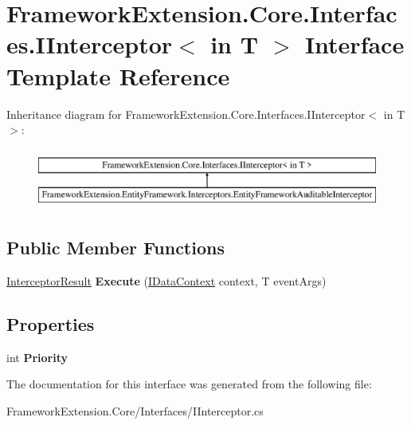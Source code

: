 \hypertarget{interface_framework_extension_1_1_core_1_1_interfaces_1_1_i_interceptor-g}{\section{Framework\-Extension.\-Core.\-Interfaces.\-I\-Interceptor$<$ in T $>$ Interface Template Reference}
\label{interface_framework_extension_1_1_core_1_1_interfaces_1_1_i_interceptor-g}
}
Inheritance diagram for Framework\-Extension.\-Core.\-Interfaces.\-I\-Interceptor$<$ in T $>$\-:\begin{figure}[H]
\begin{center}
\leavevmode
\includegraphics[height=2.000000cm]{interface_framework_extension_1_1_core_1_1_interfaces_1_1_i_interceptor-g}
\end{center}
\end{figure}
\subsection*{Public Member Functions}
\begin{DoxyCompactItemize}
\item 
\hypertarget{interface_framework_extension_1_1_core_1_1_interfaces_1_1_i_interceptor-g_a29390fc2dbc8566a239a46ce86431948}{\hyperlink{struct_framework_extension_1_1_core_1_1_interceptors_1_1_interceptor_result}{Interceptor\-Result} {\bfseries Execute} (\hyperlink{interface_framework_extension_1_1_core_1_1_interfaces_1_1_i_data_context}{I\-Data\-Context} context, T event\-Args)}\label{interface_framework_extension_1_1_core_1_1_interfaces_1_1_i_interceptor-g_a29390fc2dbc8566a239a46ce86431948}

\end{DoxyCompactItemize}
\subsection*{Properties}
\begin{DoxyCompactItemize}
\item 
\hypertarget{interface_framework_extension_1_1_core_1_1_interfaces_1_1_i_interceptor-g_a8dad5bbb0d6784578d68e58e8d836f2c}{int {\bfseries Priority}}\label{interface_framework_extension_1_1_core_1_1_interfaces_1_1_i_interceptor-g_a8dad5bbb0d6784578d68e58e8d836f2c}

\end{DoxyCompactItemize}


The documentation for this interface was generated from the following file\-:\begin{DoxyCompactItemize}
\item 
Framework\-Extension.\-Core/\-Interfaces/I\-Interceptor.\-cs\end{DoxyCompactItemize}
